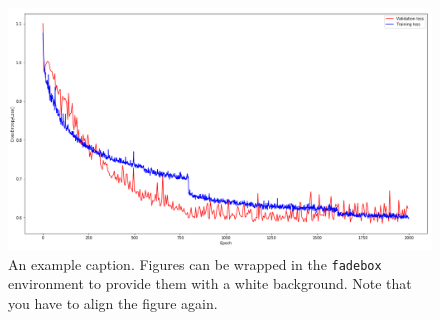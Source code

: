 \documentclass[
]{dtuposter}
\begin{document}
\begin{dtupostercontent}
\begin{figure}
  \begin{fadebox}\begin{center}
    \includegraphics[width=\linewidth,origin=c]{loss}
  \end{center}\end{fadebox}
  \caption{An example caption. Figures can be wrapped in the \texttt{fadebox} 
environment to provide them with a white background. Note that you have to align the 
figure again.}\label{fig:example2}
\end{figure}

\end{dtupostercontent}
\end{document}
